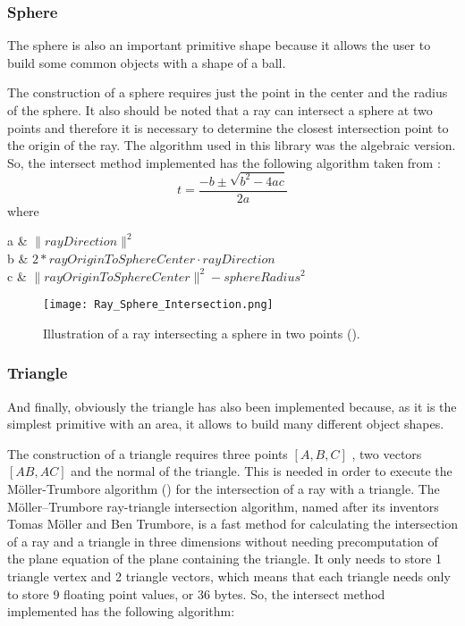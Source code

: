 \par


\subsubsection{Sphere}

\par
The sphere is also an important primitive shape because it allows the user to build some common objects with a shape of a ball.

\par
The construction of a sphere requires just the point in the center and the radius of the sphere.
It also should be noted that a ray can intersect a sphere at two points and therefore it is necessary to determine the closest intersection point to the origin of the ray.
The algorithm used in this library was the algebraic version.
So, the intersect method implemented has the following algorithm taken from \cite{RaySphere}:
\[
t=\frac{-b\pm\sqrt{b^2-4ac}}{2a}
\]
where
\begin{conditions*}
	a  &  $\|rayDirection\| ^ 2$\\
	b  &  $2 * rayOriginToSphereCenter \cdot rayDirection$\\
	c  &  $\|rayOriginToSphereCenter\| ^ 2 - sphereRadius ^ 2$
\end{conditions*}

\begin{figure}[H]
	\centering
	\caption{Illustration of a ray intersecting a sphere in two points (\cite{SphereRayIntersection}).}
	\label{Sphere.}
	\texttt{[image: Ray\_Sphere\_Intersection.png]}
\end{figure}

\subsubsection{Triangle}

\par
And finally, obviously the triangle has also been implemented because, as it is the simplest primitive with an area, it allows to build many different object shapes.

\par
The construction of a triangle requires three points
$[A, B, C]$
, two vectors
$[AB, AC]$
and the normal of the triangle.
This is needed in order to execute the Möller-Trumbore algorithm (\cite{RayTriangleIntersection}) for the intersection of a ray with a triangle.
The Möller–Trumbore ray-triangle intersection algorithm, named after its inventors Tomas Möller and Ben Trumbore, is a fast method for calculating the intersection of a ray and a triangle in three dimensions without needing precomputation of the plane equation of the plane containing the triangle.
It only needs to store 1 triangle vertex and 2 triangle vectors, which means that each triangle needs only to store 9 floating point values, or 36 bytes.
So, the intersect method implemented has the following algorithm:

